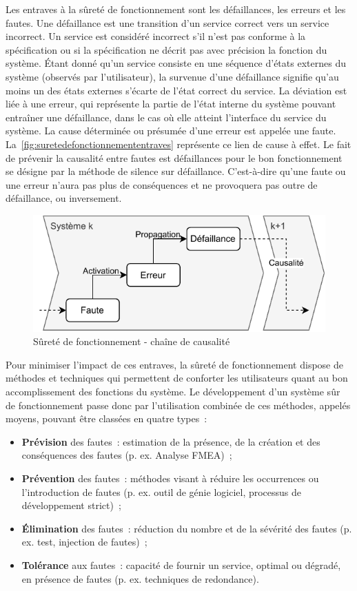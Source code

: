 \documentclass[french, a4paper, 11pt, twoside, pdftex]{StyleThese}
\begin{document}
		Les entraves à la sûreté de fonctionnement sont les défaillances, les erreurs et les fautes. Une défaillance est une transition d’un service correct vers un service incorrect. Un service est considéré incorrect s’il n’est pas conforme à la spécification ou si la spécification ne décrit pas avec précision la fonction du système. Étant donné qu’un service consiste en une séquence d’états externes du système (observés par l’utilisateur), la survenue d’une défaillance signifie qu’au moins un des états externes s’écarte de l’état correct du service. La déviation est liée à une erreur, qui représente la partie de l’état interne du système pouvant entraîner une défaillance, dans le cas où elle atteint l’interface du service du système. La cause déterminée ou
		présumée d’une erreur est appelée une faute. La~\autoref{fig:suretedefonctionnemententraves} représente ce lien de cause à effet. Le fait de prévenir la causalité entre fautes est défaillances pour le bon fonctionnement se désigne par la méthode de silence sur défaillance. C'est-à-dire qu'une faute ou une erreur n'aura pas plus de conséquences et ne provoquera pas outre de défaillance, ou inversement.
		
		\begin{figure}[h]
			\centering
			\includegraphics[width=0.7\linewidth]{schemas/SureteDeFonctionnement_entraves}
			\caption{Sûreté de fonctionnement - chaîne de causalité}
			\label{fig:suretedefonctionnemententraves}
		\end{figure}
		
		Pour minimiser l’impact de ces entraves, la sûreté de fonctionnement dispose de méthodes et techniques qui permettent de conforter les utilisateurs quant au bon accomplissement des fonctions du système. Le développement d’un système sûr de fonctionnement passe donc par l’utilisation combinée de ces méthodes, appelés moyens, pouvant être classées en quatre types~:
		\begin{itemize}
			\item \textbf{Prévision} des fautes~: estimation de la présence, de la création et des conséquences des fautes (p. ex. Analyse FMEA)~;
			\item \textbf{Prévention} des fautes~: méthodes visant à réduire les occurrences ou l’introduction de fautes (p. ex. outil de génie logiciel, processus de développement strict)~;
			\item \textbf{Élimination} des fautes~: réduction du nombre et de la sévérité des fautes (p. ex. test, injection de fautes)~;
			\item \textbf{Tolérance} aux fautes~: capacité de fournir un service, optimal ou dégradé, en présence de fautes (p. ex. techniques de redondance).
		\end{itemize}
	
\end{document}
